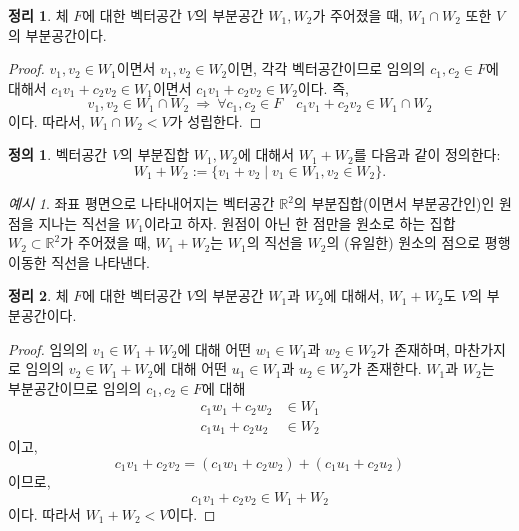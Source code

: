 \documentclass[unfonts,oneside,a4paper]{oblivoir}
\theoremstyle{definition}
\newtheorem{definition}{정의}[section]
\theoremstyle{theorem}
\newtheorem{theorem}{정리}[section]
\theoremstyle{theorem}
\theoremstyle{remark}
\theoremstyle{remark}
\theoremstyle{remark}
\newtheorem*{example}{예시}
\theoremstyle{remark}
\renewcommand{\vec}[1]{\bm{\mathit{#1}}}
\begin{document}
\begin{theorem} \label{thm:intersection}
    체 $F$에 대한 벡터공간 $V$의 부분공간 $W_1, W_2$가 주어졌을 때, $W_1 \cap W_2$ 또한 $V$의 부분공간이다.
\end{theorem}

\begin{proof}
    $\vec v_1, \vec v_2 \in W_1$이면서 $\vec v_1, \vec v_2 \in W_2$이면, 각각 벡터공간이므로 임의의 $c_1, c_2 \in F$에 대해서 $c_1 \vec v_1 + c_2 \vec v_2 \in W_1$이면서 $c_1 \vec v_1 + c_2 \vec v_2 \in W_2$이다.
    즉,
    \[
        \vec v_1, \vec v_2 \in W_1 \cap W_2\ \Rightarrow\ \forall c_1, c_2 \in F \quad c_1 \vec v_1 + c_2 \vec v_2 \in W_1 \cap W_2
    \]
    이다.
    따라서, $W_1 \cap W_2 < V$가 성립한다.
\end{proof}

\begin{definition}
    벡터공간 $V$의 부분집합 $W_1, W_2$에 대해서 $W_1 + W_2$를 다음과 같이 정의한다:
    \[
        W_1 + W_2 := \{\vec v_1 + \vec v_2 \mid \vec v_1 \in W_1, \vec v_2 \in W_2\}.
    \]
\end{definition}

\begin{example}
    좌표 평면으로 나타내어지는 벡터공간 $\mathbb R^2$의 부분집합(이면서 부분공간인)인 원점을 지나는 직선을 $W_1$이라고 하자.
    원점이 아닌 한 점만을 원소로 하는 집합 $W_2 \subset \mathbb R^2$가 주어졌을 때, $W_1 + W_2$는 $W_1$의 직선을 $W_2$의 (유일한) 원소의 점으로 평행 이동한 직선을 나타낸다.
\end{example}

\begin{theorem} \label{thm:addition}
    체 $F$에 대한 벡터공간 $V$의 부분공간 $W_1$과 $W_2$에 대해서, $W_1 + W_2$도 $V$의 부분공간이다.
\end{theorem}

\begin{proof}
    임의의 $\vec v_1 \in W_1 + W_2$에 대해 어떤 $\vec w_1 \in W_1$과 $\vec w_2 \in W_2$가 존재하며, 마찬가지로 임의의 $\vec v_2 \in W_1 + W_2$에 대해 어떤 $\vec u_1 \in W_1$과 $\vec u_2 \in W_2$가 존재한다.
    $W_1$과 $W_2$는 부분공간이므로 임의의 $c_1, c_2 \in F$에 대해
    \begin{align*}
        c_1 \vec w_1 + c_2 \vec w_2 &\in W_1\\
        c_1 \vec u_1 + c_2 \vec u_2 &\in W_2
    \end{align*}
    이고,
    \begin{equation*}
        c_1 \vec v_1 + c_2 \vec v_2 = (c_1 \vec w_1 + c_2 \vec w_2) + (c_1 \vec u_1 + c_2 \vec u_2)
    \end{equation*}
    이므로,
    \begin{equation*}
        c_1 \vec v_1 + c_2 \vec v_2 \in W_1 + W_2
    \end{equation*}
    이다.
    따라서 $W_1 + W_2 < V$이다.
\end{proof}
\end{document}
